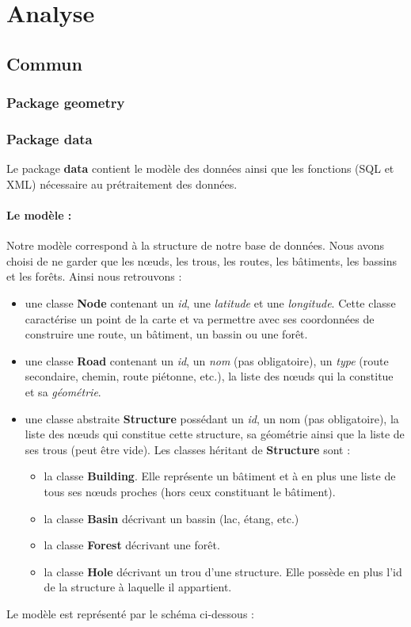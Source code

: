 \documentclass[12pt,a4paper,oneside]{article}
\begin{document}
\newpage

\tableofcontents
\newpage

\section{Analyse}

\subsection{Commun}
\subsubsection{Package geometry}
\subsubsection{Package data}
Le package \textbf{data} contient le modèle des données ainsi que les fonctions (SQL et XML) nécessaire au prétraitement des données.
\paragraph{Le modèle : \\}
Notre modèle correspond à la structure de notre base de données. Nous avons choisi de ne garder que les nœuds, les trous, les routes, les bâtiments, les bassins et les forêts. Ainsi nous retrouvons : \\
\renewcommand{\labelitemi}{$\bullet$}
\begin{itemize}
\item une classe \textbf{Node} contenant un \textit{id}, une \textit{latitude} et une \textit{longitude}. Cette classe caractérise un point de la carte et va permettre avec ses coordonnées de construire une route, un bâtiment, un bassin ou une forêt.
\item une classe \textbf{Road} contenant un \textit{id}, un \textit{nom} (pas obligatoire),  un \textit{type} (route secondaire, chemin, route piétonne, etc.), la liste des nœuds qui la constitue et sa \textit{géométrie}.
\item une classe abstraite \textbf{Structure} possédant un \textit{id}, un {nom} (pas obligatoire), la liste des nœuds qui constitue cette structure, sa géométrie ainsi que la liste de ses trous (peut être vide). Les classes héritant de \textbf{Structure} sont :
	\begin{itemize}
	\item la classe \textbf{Building}. Elle représente un bâtiment et à en plus une liste de tous ses nœuds proches (hors ceux constituant le bâtiment).
	\item la classe \textbf{Basin} décrivant un bassin (lac, étang, etc.)
	\item la classe \textbf{Forest} décrivant une forêt.
	\item la classe \textbf{Hole} décrivant un trou d'une structure. Elle possède en plus l'id de la structure à laquelle il appartient.
	\end{itemize}
\end{itemize}
Le modèle est représenté par le schéma ci-dessous :\\
\end{document}

